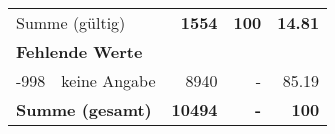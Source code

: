 \begin{longtable}{lXrrr}
     \midrule
     \multicolumn{2}{l}{Summe (gültig)} &
       \textbf{\num{1554}} &
     \textbf{\num{100}} &
       \textbf{\num[round-mode=places,round-precision=2]{14.81}} \\
     \multicolumn{5}{l}{\textbf{Fehlende Werte}}\\
       -998 &
       keine Angabe &
         \num{8940} &
        - &
         \num[round-mode=places,round-precision=2]{85.19} \\
     \midrule
     \multicolumn{2}{l}{\textbf{Summe (gesamt)}} &
          \textbf{\num{10494}} &
        \textbf{-} &
        \textbf{\num{100}} \\
     \bottomrule
     \end{longtable}
     

